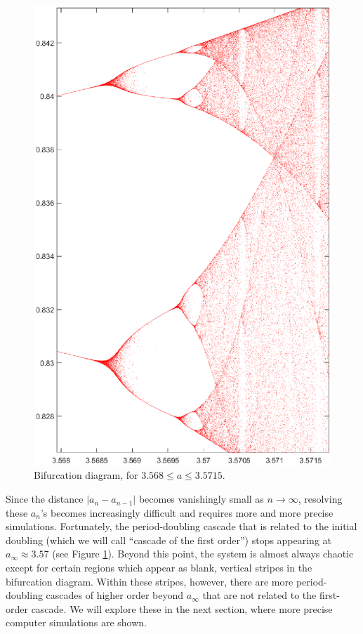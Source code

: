 \documentclass[twocolumn,amsmath,amssymb,aps]{revtex4}
\begin{document}
\begin{figure}[!htb]
	\centering
	\includegraphics[scale=0.4]{logistic_5_more_branches}
	\caption{Bifurcation diagram, for $3.568 \leq a \leq 3.5715$.}
	\label{fig:logistic_5}
\end{figure}


Since the distance $|a_{n} - a_{n-1}|$ becomes vanishingly small as $n\to \infty$, resolving these $a_{n}$'s becomes increasingly difficult and requires more and more precise simulations. Fortunately, the period-doubling cascade that is related to the initial doubling (which we will call ``cascade of the first order'')  stops appearing at $a_\infty\approx 3.57$ (see Figure \ref{fig:logistic_5}). Beyond this point, the system is almost always chaotic except for certain regions which appear as blank, vertical stripes in the bifurcation diagram. Within these stripes, however, there are more period-doubling cascades of higher order beyond $a_\infty$ that are not related to the first-order cascade. We will explore these in the next section, where more precise computer simulations are shown.
\end{document}
